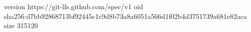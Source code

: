 version https://git-lfs.github.com/spec/v1
oid sha256:d7bb92868713bf92445c1c9d8b73a8a6051a566d1f02b4d3751739a681e82aca
size 315120
